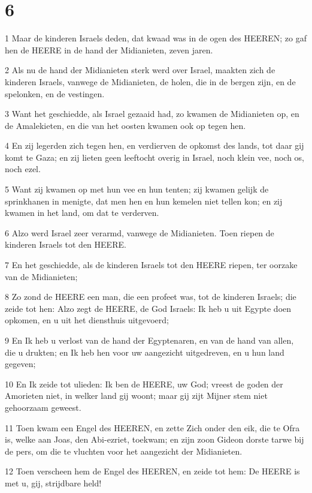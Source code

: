 \chapter{6}

\par 1 Maar de kinderen Israels deden, dat kwaad was in de ogen des HEEREN; zo gaf hen de HEERE in de hand der Midianieten, zeven jaren.
\par 2 Als nu de hand der Midianieten sterk werd over Israel, maakten zich de kinderen Israels, vanwege de Midianieten, de holen, die in de bergen zijn, en de spelonken, en de vestingen.
\par 3 Want het geschiedde, als Israel gezaaid had, zo kwamen de Midianieten op, en de Amalekieten, en die van het oosten kwamen ook op tegen hen.
\par 4 En zij legerden zich tegen hen, en verdierven de opkomst des lands, tot daar gij komt te Gaza; en zij lieten geen leeftocht overig in Israel, noch klein vee, noch os, noch ezel.
\par 5 Want zij kwamen op met hun vee en hun tenten; zij kwamen gelijk de sprinkhanen in menigte, dat men hen en hun kemelen niet tellen kon; en zij kwamen in het land, om dat te verderven.
\par 6 Alzo werd Israel zeer verarmd, vanwege de Midianieten. Toen riepen de kinderen Israels tot den HEERE.
\par 7 En het geschiedde, als de kinderen Israels tot den HEERE riepen, ter oorzake van de Midianieten;
\par 8 Zo zond de HEERE een man, die een profeet was, tot de kinderen Israels; die zeide tot hen: Alzo zegt de HEERE, de God Israels: Ik heb u uit Egypte doen opkomen, en u uit het diensthuis uitgevoerd;
\par 9 En Ik heb u verlost van de hand der Egyptenaren, en van de hand van allen, die u drukten; en Ik heb hen voor uw aangezicht uitgedreven, en u hun land gegeven;
\par 10 En Ik zeide tot ulieden: Ik ben de HEERE, uw God; vreest de goden der Amorieten niet, in welker land gij woont; maar gij zijt Mijner stem niet gehoorzaam geweest.
\par 11 Toen kwam een Engel des HEEREN, en zette Zich onder den eik, die te Ofra is, welke aan Joas, den Abi-ezriet, toekwam; en zijn zoon Gideon dorste tarwe bij de pers, om die te vluchten voor het aangezicht der Midianieten.
\par 12 Toen verscheen hem de Engel des HEEREN, en zeide tot hem: De HEERE is met u, gij, strijdbare held!
